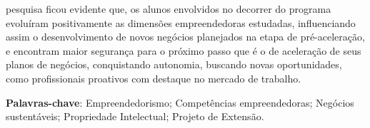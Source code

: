 \begin{resumo}
pesquisa ficou evidente que, os alunos envolvidos no decorrer do programa evoluíram positivamente as dimensões empreendedoras estudadas, influenciando assim o desenvolvimento de novos negócios planejados na etapa de pré-aceleração, e encontram maior segurança para o próximo passo que é o de aceleração de seus planos de negócios, conquistando autonomia, buscando novas oportunidades, como profissionais proativos com destaque no mercado de trabalho.

\textbf{Palavras-chave}: Empreendedorismo; Competências empreendedoras; Negócios sustentáveis; Propriedade Intelectual; Projeto de Extensão.
\end{resumo}